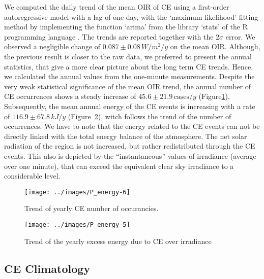 \documentclass[preprint, 3p,
authoryear]{elsarticle} %
\begin{document}
We computed the daily trend of the mean OIR of CE using a first-order
autoregressive model with a lag of one day, with the `maximum
likelihood' fitting method \citep{Gardner1980, Jones1980} by
implementing the function `arima' from the library `stats' of the R
programming language \citep{RCT2023}. The trends are reported together
with the \(2\sigma\) error. We observed a negligible change of
\(0.087\pm 0.08\,W/m^2/y\) on the mean OIR. Although, the previous
result is closer to the raw data, we preferred to present the annual
statistics, that give a more clear picture about the long term CE
trends. Hence, we calculated the annual values from the one-minute
measurements. Despite the very weak statistical significance of the mean
OIR trend, the annual number of CE occurrences shows a steady increase
of \(45.6\pm 21.9\,\text{cases}/y\)
(Figure\nobreakspace{}\ref{fig:P-energy-N}). Subsequently, the mean
annual energy of the CE events is increasing with a rate of
\(116.9\pm 67.8\,kJ/y\) (Figure~\ref{fig:P-energy-sum}), witch follows
the trend of the number of occurrences. We have to note that the energy
related to the CE events can not be directly linked with the total
energy balance of the atmosphere. The net solar radiation of the region
is not increased, but rather redistributed through the CE events. This
also is depicted by the ``instantaneous'' values of irradiance (average
over one minute), that can exceed the equivalent clear sky irradiance to
a considerable level.

\begin{figure}

{\centering \texttt{[image: ../images/P\_energy-6]} 

}

\caption{Trend of yearly CE number of occurancies.}\label{fig:P-energy-N}
\end{figure}

\begin{figure}

{\centering \texttt{[image: ../images/P\_energy-5]} 

}

\caption{Trend of the yearly excess energy due to CE over irradiance}\label{fig:P-energy-sum}
\end{figure}

\hypertarget{ce-climatology}{%
\subsection{CE Climatology}\label{ce-climatology}}
\end{document}
